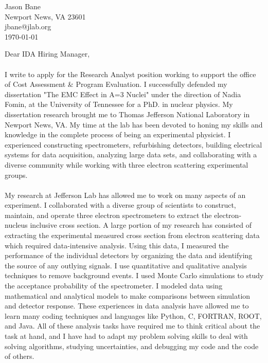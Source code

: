 \documentclass[12pt,letterpaper]{article}
\newcommand{\CPP}
{C\nolinebreak[4]\hspace{-.05em}\raisebox{.22ex}{\footnotesize\bf ++}}
\begin{document}
\vspace*{-1.2cm}
\noindent Jason Bane\\
Newport News, VA 23601 \\
jbane@jlab.org \\

\noindent\today\\

\noindent 

Dear IDA Hiring Manager, 

\paragraph{}I write to apply for the Research Analyst position working to support the office of Cost Assessment \& Program Evaluation. I successfully defended my dissertation "The EMC Effect in A=3 Nuclei" under the direction of Nadia Fomin, at the University of Tennessee for a PhD. in nuclear physics. My dissertation research brought me to Thomas Jefferson National Laboratory in Newport News, VA. My time at the lab has been devoted to honing my skills and knowledge in the complete process of being an experimental physicist. I experienced constructing spectrometers, refurbishing detectors, building electrical systems for data acquisition, analyzing large data sets, and collaborating with a diverse community while working with three electron scattering experimental groups.

\paragraph{}My research at Jefferson Lab has allowed me to work on many aspects of an experiment. I collaborated with a diverse group of scientists to construct, maintain, and operate three electron spectrometers to extract the electron-nucleus inclusive cross section. A large portion of my research has consisted of extracting the experimental measured cross section from electron scattering data which required data-intensive analysis. Using this data, I measured the performance of the individual detectors by organizing the data and identifying the source of any outlying signals. I use quantitative and qualitative analysis techniques to remove background events. I used Monte Carlo simulations to study the acceptance probability of the spectrometer. I modeled data using mathematical and analytical models to make comparisons between simulation and detector response. These experiences in data analysis have allowed me to learn many coding techniques and languages like Python, \CPP, FORTRAN, ROOT, and Java. All of these analysis tasks have required me to think critical about the task at hand, and I have had to adapt my problem solving skills to deal with solving algorithms, studying uncertainties, and debugging my code and the code of others.   
\end{document}
